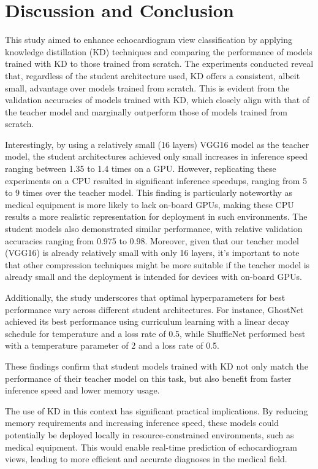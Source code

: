 \documentclass[11pt]{article}
\begin{document}
\section{Discussion and Conclusion}

This study aimed to enhance echocardiogram view classification by applying knowledge distillation (KD) techniques and comparing the performance of models trained with KD to those trained from scratch. The experiments conducted reveal that, regardless of the student architecture used, KD offers a consistent, albeit small, advantage over models trained from scratch. This is evident from the validation accuracies of models trained with KD, which closely align with that of the teacher model and marginally outperform those of models trained from scratch.

Interestingly, by using a relatively small (16 layers) VGG16 model as the teacher model, the student architectures achieved only small increases in inference speed ranging between 1.35 to 1.4 times on a GPU. However, replicating these experiments on a CPU resulted in significant inference speedups, ranging from 5 to 9 times over the teacher model. This finding is particularly noteworthy as medical equipment is more likely to lack on-board GPUs, making these CPU results a more realistic representation for deployment in such environments. The student models also demonstrated similar performance, with relative validation accuracies ranging from 0.975 to 0.98. Moreover, given that our teacher model (VGG16) is already relatively small with only 16 layers, it's important to note that other compression techniques might be more suitable if the teacher model is already small and the deployment is intended for devices with on-board GPUs.

Additionally, the study underscores that optimal hyperparameters for best performance vary across different student architectures. For instance, GhostNet achieved its best performance using curriculum learning with a linear decay schedule for temperature and a loss rate of 0.5, while ShuffleNet performed best with a temperature parameter of 2 and a loss rate of 0.5.

These findings confirm that student models trained with KD not only match the performance of their teacher model on this task, but also benefit from faster inference speed and lower memory usage.

The use of KD in this context has significant practical implications. By reducing memory requirements and increasing inference speed, these models could potentially be deployed locally in resource-constrained environments, such as medical equipment. This would enable real-time prediction of echocardiogram views, leading to more efficient and accurate diagnoses in the medical field.
\end{document}
